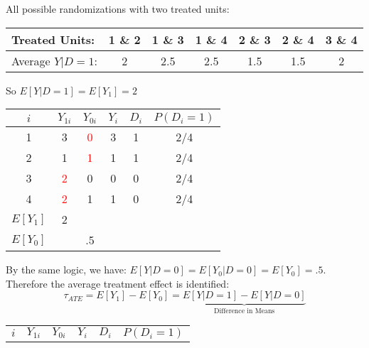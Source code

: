 \documentclass{beamer}
\numberwithin{equation}{section}
\begin{document}
\begin{frame}
\begin{overprint}
All possible randomizations with two treated units:
\begin{center}
\begin{tabular}{lcccccc}
    Treated Units: & 1 \& 2 & 1 \& 3 & 1 \& 4 & 2 \& 3 & 2 \& 4 & 3 \& 4 \\
    \hline
   Average $Y|D=1$: & 2 & 2.5 & 2.5 & 1.5 & 1.5 & 2 \\
\end{tabular}
\end{center}
So $E[Y|D=1]=E[Y_1]=2$
\begin{center}
\begin{tabular}{cccccc}
 \multicolumn{1}{p{2cm}}{\center $i$} &   \multicolumn{1}{p{1cm}}{\center $Y_{1i}$} & \multicolumn{1}{p{1cm}}{\center $Y_{0i}$}&    \multicolumn{1}{p{1cm}}{\center $Y_{i}$} &   \multicolumn{1}{p{1cm}}{\center $D_{i}$}   &   \multicolumn{1}{p{2cm}}{\center $P(D_{i}=1)$}   \\
\hline
\rowcolor{gray!10}        1 &          3 &        \textcolor{red}{0} &          3 &          1 & 2/4  \\
\rowcolor{gray!10}         2 &         1 &       \textcolor{red}{1} &          1 &          1  & 2/4 \\
\rowcolor{gray!30}         3 &          \textcolor{red}{2} &         0 &          0 &          0  & 2/4 \\
\rowcolor{gray!30}         4 &          \textcolor{red}{2} &         1 &          1 &          0 & 2/4  \\
\hline
$E[Y_1]$& 2 & & &    \\
$E[Y_0]$&  & .5 &  &    \\
\hline
\end{tabular}
\end{center}
\bigskip
By the same logic, we have: $E[Y|D=0]=E[Y_0|D=0]=E[Y_0]=.5$.\bigskip\\
Therefore the average treatment effect is \alert{identified}:
\[
\tau_{ATE}=E[Y_1] -E[Y_0]=\underbrace{E[Y|D=1]-E[Y|D=0]}_{\mbox{Difference in Means}}
\]
\begin{center}
\begin{tabular}{cccccc}
 \multicolumn{1}{p{2cm}}{\center $i$} &   \multicolumn{1}{p{1cm}}{\center $Y_{1i}$} & \multicolumn{1}{p{1cm}}{\center $Y_{0i}$}&    \multicolumn{1}{p{1cm}}{\center $Y_{i}$} &   \multicolumn{1}{p{1cm}}{\center $D_{i}$}   &   \multicolumn{1}{p{2cm}}{\center $P(D_{i}=1)$}   \\

\end{tabular}
\end{center}
\end{overprint}
\end{frame}
\end{document}
